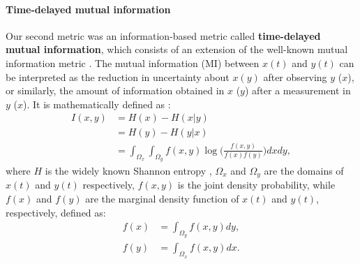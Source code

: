 \documentclass[../main.tex]{subfiles}
\begin{document}
\paragraph{Time-delayed mutual information}
Our second metric was an information-based metric called \textbf{time-delayed mutual information}, which consists of an extension of the well-known mutual information metric \citep{shannon1948mathematical,klir1999uncertainty,kirst_dynamic_2016}.
The mutual information (MI) between $x(t)$ and $y(t)$ can be interpreted as the reduction in uncertainty about $x(y)$ after observing $y$ ($x$), or similarly, the amount of information obtained in $x$ ($y$) after a measurement in $y$ ($x$).
It is mathematically defined as \citep{klir1999uncertainty}:
\begin{equation}
            \begin{aligned}
            I(x,y) &= H(x) - H(x|y) \\
                   &=  H(y) - H(y|x) \\
                   &= \displaystyle\int_{\Omega_x} \displaystyle\int_{\Omega_y}  f(x,y)\log\Bigg( 
            \displaystyle\frac{f(x,y)}{f(x)f(y)}\Bigg) dxdy,
            \end{aligned}
    \label{eq:mutual-information}
\end{equation}
where $H$ is the widely known Shannon entropy \citep{shannon1948mathematical,klir1999uncertainty}, $\Omega_x$ and $\Omega_y$ are the domains of $x(t)$ and $y(t)$ respectively, $f(x,y)$ is the joint density probability, while $f(x)$ and $f(y)$ are the marginal density function of $x(t)$ and $y(t)$, respectively, defined as:
\begin{equation}
    \begin{aligned}
        f(x) &= \displaystyle\int_{\Omega_y} f(x,y)dy,\\
        f(y) &= \displaystyle\int_{\Omega_x} f(x,y)dx.
    \end{aligned}
\end{equation}
\end{document}

